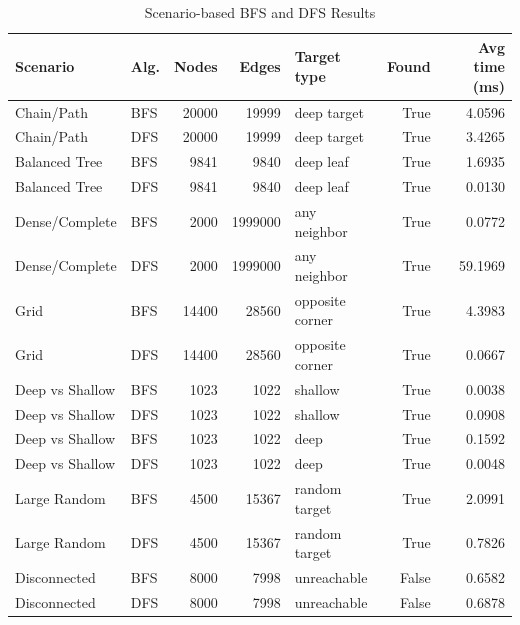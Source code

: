 \begin{table}[H]
\centering
\caption{Scenario-based BFS and DFS Results}
\small
\begin{tabular}{llrrlrr}
\toprule
Scenario & Alg. & Nodes & Edges & Target type & Found & Avg time (ms)\\
\midrule
Chain/Path & BFS & 20000 & 19999 & deep target & True & 4.0596\\
Chain/Path & DFS & 20000 & 19999 & deep target & True & 3.4265\\
Balanced Tree & BFS & 9841 & 9840 & deep leaf & True & 1.6935\\
Balanced Tree & DFS & 9841 & 9840 & deep leaf & True & 0.0130\\
Dense/Complete & BFS & 2000 & 1999000 & any neighbor & True & 0.0772\\
Dense/Complete & DFS & 2000 & 1999000 & any neighbor & True & 59.1969\\
Grid & BFS & 14400 & 28560 & opposite corner & True & 4.3983\\
Grid & DFS & 14400 & 28560 & opposite corner & True & 0.0667\\
Deep vs Shallow & BFS & 1023 & 1022 & shallow & True & 0.0038\\
Deep vs Shallow & DFS & 1023 & 1022 & shallow & True & 0.0908\\
Deep vs Shallow & BFS & 1023 & 1022 & deep & True & 0.1592\\
Deep vs Shallow & DFS & 1023 & 1022 & deep & True & 0.0048\\
Large Random & BFS & 4500 & 15367 & random target & True & 2.0991\\
Large Random & DFS & 4500 & 15367 & random target & True & 0.7826\\
Disconnected & BFS & 8000 & 7998 & unreachable & False & 0.6582\\
Disconnected & DFS & 8000 & 7998 & unreachable & False & 0.6878\\
\bottomrule
\end{tabular}
\end{table}
